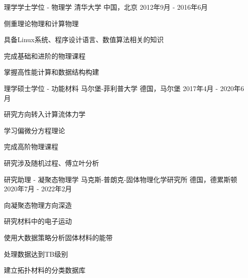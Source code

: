 

\begin{cventries}

  \cventry
    {理学学士学位 - 物理学} %
    {清华大学} %
    {中国，北京} %
    {2012年9月 - 2016年6月} %
    {
      \begin{cvitems} %
        \item {侧重理论物理和计算物理}
        \item {具备Linux系统、程序设计语言、数值算法相关的知识}
        \item {完成基础和进阶的物理课程}
        \item {掌握高性能计算和数据结构构建}
      \end{cvitems}
    }

  \cventry
    {理学硕士学位 - 功能材料}
    {马尔堡-菲利普大学}
    {德国，马尔堡}
    {2017年4月 - 2020年6月}
    {
      \begin{cvitems}
        \item {研究方向转入计算流体力学}
        \item {学习偏微分方程理论}
        \item {完成高阶物理课程}
        \item {研究涉及随机过程、傅立叶分析}
      \end{cvitems}
    }
    
  \cventry
    {研究助理 - 凝聚态物理学}
    {马克斯-普朗克-固体物理化学研究所}
    {德国，德累斯顿}
    {2020年7月 - 2022年2月}
    {
      \begin{cvitems}
        \item {向凝聚态物理方向深造}
        \item {研究材料中的电子运动}
        \item {使用大数据策略分析固体材料的能带}
        \item {处理数据达到TB级别}
        \item {建立拓扑材料的分类数据库}
      \end{cvitems}
    }
\end{cventries}
